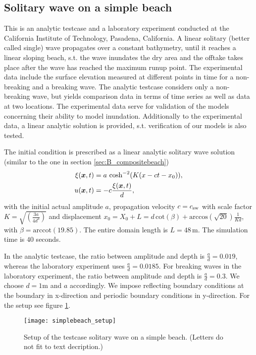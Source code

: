 \subsection{Solitary wave on a simple beach}
This is an analytic testcase and a laboratory experiment conducted at the California Institute of Technology, Pasadena, California. A linear solitary (better called single) wave propagates over a  constant bathymetry, until it reaches a linear sloping beach, s.t. the wave inundates the dry area and the offtake takes place after the wave has reached the maximum runup point. 
The experimental data include the surface elevation measured at different points in time for a non-breaking and a breaking wave. The analytic testcase considers only a non-breaking wave, but yields comparison data in terms of time series as well as data at two locations.
The experimental data serve for validation of the models concerning their ability to model inundation. Additionally to the experimental data, a linear analytic solution is provided, s.t. verification of our models is also tested.

The initial condition is prescribed as a linear analytic solitary wave solution (similar to the one in section \ref{sec:B_compositebeach})
\begin{align}
\xi(\boldsymbol{x},t)&=a \ \text{cosh}^{-2}(K(x-ct-x_0)), \\
u(\boldsymbol{x},t)&=-c\frac{\xi(\boldsymbol{x},t)}{d},
\end{align}
with the initial actual amplitude $a$, propagation velocity $c=c_{\text{sw}}$ with scale factor $K=\sqrt{\left(\frac{3a}{4d^3}\right)}$ and displacement $x_0=X_0+L=d \, \text{cot}(\beta)+\text{arccos}(\sqrt{20})\frac{1}{Kd}$, with $\beta=\text{arccot}(19.85)$. The entire domain length is $L=48 \, \text{m}$. The simulation time is $40$ seconds. 

In the analytic testcase, the ratio between amplitude and depth is $\frac{a}{d}=0.019$, whereas the laboratory experiment uses  $\frac{a}{d}=0.0185$. 
For breaking waves in the laboratory experiment, the ratio between amplitude and depth is $\frac{a}{d}=0.3$. We choose $d=1$m and $a$ accordingly.
We impose reflecting boundary conditions at the boundary in x-direction and periodic boundary conditions in y-direction. For the setup see figure \ref{fig:simplebeach_setup}. 

\begin{figure}[htbp]
\texttt{[image: simplebeach\_setup]}
\caption{Setup of the testcase solitary wave on a simple beach. (Letters do not fit to text decription.)}
\label{fig:simplebeach_setup}
\end{figure}

